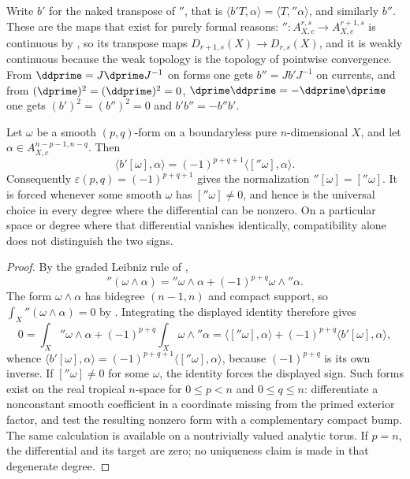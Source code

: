 Write $b'$ for the naked transpose of $\dprime$, that is
$\langle b'T,\alpha\rangle=\langle T,\dprime\alpha\rangle$, and similarly
$b''$.  These are the maps that exist for purely formal reasons:
$\dprime:A_{X,c}^{r,s}\to A_{X,c}^{r+1,s}$ is continuous by
, so its transpose maps
$D_{r+1,s}(X)\to D_{r,s}(X)$, and it is weakly continuous because the weak
topology is the topology of pointwise convergence.  From $\ddprime=J\dprime
J^{-1}$ on forms one gets $b''=Jb'J^{-1}$ on currents, and from
$(\dprime)^2=(\ddprime)^2=0$, $\dprime\ddprime=-\ddprime\dprime$ one gets
$(b')^2=(b'')^2=0$ and $b'b''=-b''b'$.

\begin{lemma}
\label{lem:ch14-sign-forced}
Let $\omega$ be a smooth $(p,q)$-form on a boundaryless pure
$n$-dimensional $X$, and let $\alpha\in A_{X,c}^{n-p-1,n-q}$.  Then
\[
 \langle b'[\omega],\alpha\rangle
 =(-1)^{p+q+1}\langle[\dprime\omega],\alpha\rangle .
\]
Consequently $\varepsilon(p,q)=(-1)^{p+q+1}$ gives the normalization
$\dprime[\omega]=[\dprime\omega]$. It is forced whenever some smooth
$\omega$ has $[\dprime\omega]\ne0$, and hence is the universal choice
in every degree where the differential can be nonzero. On a particular
space or degree where that differential vanishes identically,
compatibility alone does not distinguish the two signs.
\end{lemma}

\begin{proof}
By the graded Leibniz rule of ,
\[
 \dprime(\omega\wedge\alpha)
 =\dprime\omega\wedge\alpha+(-1)^{p+q}\omega\wedge\dprime\alpha .
\]
The form $\omega\wedge\alpha$ has bidegree $(n-1,n)$ and compact support, so
$\int_X\dprime(\omega\wedge\alpha)=0$ by
.  Integrating the displayed identity
therefore gives
\[
 0=\int_X\dprime\omega\wedge\alpha
   +(-1)^{p+q}\int_X\omega\wedge\dprime\alpha
 =\langle[\dprime\omega],\alpha\rangle
   +(-1)^{p+q}\langle b'[\omega],\alpha\rangle,
\]
whence $\langle b'[\omega],\alpha\rangle=(-1)^{p+q+1}
\langle[\dprime\omega],\alpha\rangle$, because $(-1)^{p+q}$ is its own
inverse. If $[\dprime\omega]\ne0$ for some $\omega$, the identity forces
the displayed sign. Such forms exist on the real tropical $n$-space
for $0\le p<n$ and $0\le q\le n$: differentiate a nonconstant smooth
coefficient in a coordinate missing from the primed exterior factor,
and test the resulting nonzero form with a complementary compact bump.
The same calculation is available on a nontrivially valued analytic
torus. If $p=n$, the differential and its target are zero; no uniqueness
claim is made in that degenerate degree.
\end{proof}

